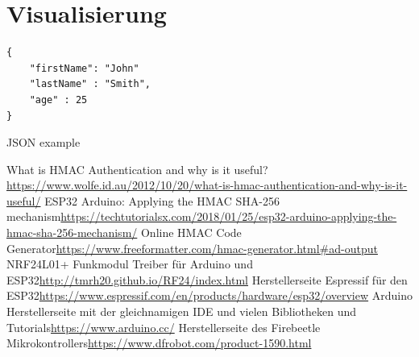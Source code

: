 \documentclass[
  12pt, %
  a4paper, %
  twoside, %
  openright, %
  numbers=noenddot, %
  BCOR=5mm, %
  parskip=half*, %
  thesis, %
]{bfhbook}
\begin{document}
\section{Visualisierung}
\begin{listing}
\begin{verbatim}
{     
    "firstName": "John"
    "lastName" : "Smith",
    "age" : 25
}
\end{verbatim}
\caption{JSON example} 
\label{json-example}
\end{listing}

\listoffigures
\listoftables
\printglossary

\renewcommand\bibname{Linkverzeichnis}
\begin{thebibliography}{99}
    What is HMAC Authentication and why is it useful?\break \url{https://www.wolfe.id.au/2012/10/20/what-is-hmac-authentication-and-why-is-it-useful/}
     ESP32 Arduino: Applying the HMAC SHA-256 mechanism\break \url{https://techtutorialsx.com/2018/01/25/esp32-arduino-applying-the-hmac-sha-256-mechanism/}
     Online HMAC Code Generator\break \url{https://www.freeformatter.com/hmac-generator.html#ad-output}
     NRF24L01+ Funkmodul Treiber für Arduino und ESP32\break \url{http://tmrh20.github.io/RF24/index.html}
     Herstellerseite Espressif für den ESP32\break \url{https://www.espressif.com/en/products/hardware/esp32/overview}
     Arduino Herstellerseite mit der gleichnamigen IDE und vielen Bibliotheken und Tutorials\break \url{https://www.arduino.cc/}
     Herstellerseite des Firebeetle Mikrokontrollers\break \url{https://www.dfrobot.com/product-1590.html}
  \end{thebibliography}
\end{document}
